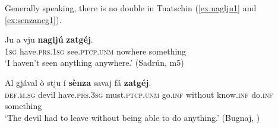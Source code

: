 Generally speaking, there is no double  in Tuatschin (\ref{ex:naglju1} and \ref{ex:senzaneg1}).

\ea
\label{ex:naglju1}
\gll Ju a vju \textbf{nagljú} \textbf{zatgéj}.\\
\textsc{1sg} have.\textsc{prs.1sg} see.\textsc{ptcp.unm} nowhere something\\
\glt `I haven't seen anything anywhere.' (Sadrún, m5)
\z

\ea
\label{ex:senzaneg1}
\gll    Al gjával ò stju í \textbf{sènza} savaj fá \textbf{zatgéj}.\\
      \textsc{def.m.sg} devil have.\textsc{prs.3sg} must.\textsc{ptcp.unm} go.\textsc{inf} without know.\textsc{inf} do.\textsc{inf} something \\
\glt `The devil had to leave without being able to do anything.' (Bugnaj, \citealt[147]{Büchli1966})
\z



